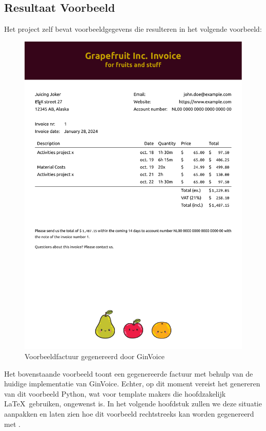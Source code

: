 \subsection{Resultaat Voorbeeld}
Het project zelf bevat voorbeeldgegevens die resulteren in het volgende voorbeeld:
\begin{figure}[!ht]
    \centering
    \includegraphics[width=\linewidth]{ginvoice/ginvoice.pdf}
    \caption{Voorbeeldfactuur gegenereerd door GinVoice}
    \label{fig:voorbeeldfactuur}
\end{figure}
Het bovenstaande voorbeeld toont een gegenereerde factuur met behulp van de huidige implementatie van GinVoice.
Echter, op dit moment vereist het genereren van dit voorbeeld Python, wat voor template makers die hoofdzakelijk \LaTeX\ gebruiken, ongewenst is.
In het volgende hoofdstuk zullen we deze situatie aanpakken en laten zien hoe dit voorbeeld rechtstreeks kan worden gegenereerd met \LuaLaTeX.
